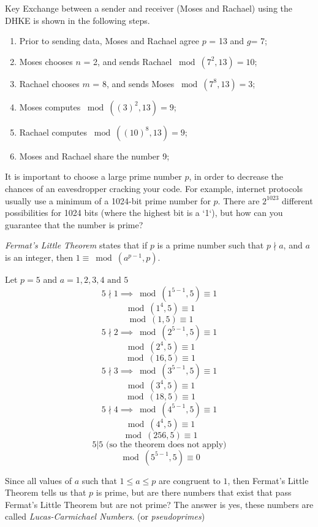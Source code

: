  \begin{eg} Key Exchange between a sender and receiver (Moses and Rachael) using the DHKE is shown in the following steps.
\begin{enumerate}[Step 1.]
\item Prior to sending data, Moses and Rachael agree $p$ = 13 and $g$= 7; 
\item Moses chooses $n$ = 2, and sends Rachael $\bmod (7^2 , 13) = 10$;
\item Rachael chooses $m$ = 8, and sends Moses $\bmod (7^8  , 13) = 3 $;
\item Moses computes $\bmod ((3)^2 , 13 ) = 9$;
\item Rachael computes $\bmod ((10)^8 , 13 ) = 9$;
\item Moses and Rachael share the number 9;
\end{enumerate}
\end{eg}
It is important to choose a large prime number $p$, in order to decrease the chances of an eavesdropper cracking your code.  For example, internet protocols usually use a minimum of a 1024-bit prime number for $p$.  There are $2^{1023}$ different possibilities for 1024 bits (where the highest bit is a `1`), but how can you guarantee that the number is prime?

  \emph{Fermat's Little Theorem} states that if $p$ is a prime number such that $p \nmid a$, and $a$ is an integer, then $1 \equiv \bmod(a^{p-1}, p)$.

\begin{eg} Let $p = 5$ and $a = 1, 2, 3, 4 \text{ and } 5$
$$ 5 \nmid 1 \implies \bmod(1^{5-1}, 5) \equiv 1$$
$$ \bmod(1^{4}, 5) \equiv 1$$
$$ \bmod(1, 5) \equiv 1$$
$$ 5 \nmid 2 \implies \bmod(2^{5-1}, 5) \equiv 1$$
$$ \bmod(2^{4}, 5) \equiv 1$$
$$ \bmod(16, 5) \equiv 1$$
$$ 5 \nmid 3 \implies \bmod(3^{5-1}, 5) \equiv 1$$
$$ \bmod(3^{4}, 5) \equiv 1$$
$$ \bmod(18	, 5) \equiv 1$$
$$ 5 \nmid 4 \implies \bmod(4^{5-1}, 5) \equiv 1$$
$$ \bmod(4^{4}, 5) \equiv 1$$
$$ \bmod(256, 5) \equiv 1$$
$$ 5 | 5 \text { (so the theorem does not apply)}$$
$$ \bmod(5^{5-1}, 5) \equiv 0$$
\end{eg}
Since all values of $a$ such that $1 \leq a \leq p$ are congruent to $1$, then Fermat's Little Theorem tells us that $p$ is prime, but are there numbers that exist that pass Fermat's Little Theorem but are not prime?  The answer is yes, these numbers are called \emph{Lucas-Carmichael Numbers}.  (or \emph{pseudoprimes}) 

